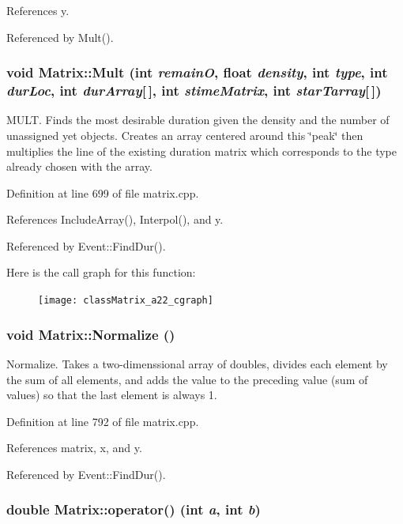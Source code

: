 References y.

Referenced by Mult().
\subsubsection{\setlength{\rightskip}{0pt plus 5cm}void Matrix::Mult (int {\em remain\-O}, float {\em density}, int {\em type}, int {\em dur\-Loc}, int {\em dur\-Array}[$\,$], int {\em stime\-Matrix}, int {\em star\-Tarray}[$\,$])}\label{classMatrix_a22}


MULT. Finds the most desirable duration given the density and the number of unassigned yet objects. Creates an array centered around this \char`\"{}peak\char`\"{} then multiplies the line of the existing duration matrix which corresponds to the type already chosen with the array. 

Definition at line 699 of file matrix.cpp.

References Include\-Array(), Interpol(), and y.

Referenced by Event::Find\-Dur().

Here is the call graph for this function:\begin{figure}[H]
\begin{center}
\leavevmode
\texttt{[image: classMatrix\_a22\_cgraph]}
\end{center}
\end{figure}
\subsubsection{\setlength{\rightskip}{0pt plus 5cm}void Matrix::Normalize ()}\label{classMatrix_a23}


Normalize. Takes a two-dimenssional array of doubles, divides each element by the sum of all elements, and adds the value to the preceding value (sum of values) so that the last element is always 1. 

Definition at line 792 of file matrix.cpp.

References matrix, x, and y.

Referenced by Event::Find\-Dur().
\subsubsection{\setlength{\rightskip}{0pt plus 5cm}double Matrix::operator() (int {\em a}, int {\em b})}\label{classMatrix_a4}




